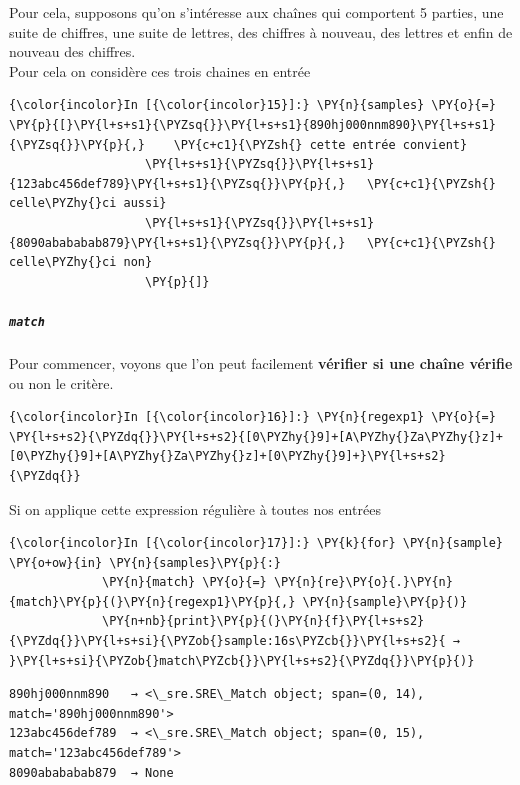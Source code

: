 Pour cela, supposons qu'on s'intéresse aux chaînes qui comportent 5
parties, une suite de chiffres, une suite de lettres, des chiffres à
nouveau, des lettres et enfin de nouveau des chiffres.\\

    Pour cela on considère ces trois chaines en entrée

    \begin{Verbatim}[commandchars=\\\{\}]
{\color{incolor}In [{\color{incolor}15}]:} \PY{n}{samples} \PY{o}{=} \PY{p}{[}\PY{l+s+s1}{\PYZsq{}}\PY{l+s+s1}{890hj000nnm890}\PY{l+s+s1}{\PYZsq{}}\PY{p}{,}    \PY{c+c1}{\PYZsh{} cette entrée convient}
                   \PY{l+s+s1}{\PYZsq{}}\PY{l+s+s1}{123abc456def789}\PY{l+s+s1}{\PYZsq{}}\PY{p}{,}   \PY{c+c1}{\PYZsh{} celle\PYZhy{}ci aussi}
                   \PY{l+s+s1}{\PYZsq{}}\PY{l+s+s1}{8090abababab879}\PY{l+s+s1}{\PYZsq{}}\PY{p}{,}   \PY{c+c1}{\PYZsh{} celle\PYZhy{}ci non}
                   \PY{p}{]}
\end{Verbatim}


    \hypertarget{match}{%
\subparagraph{\texorpdfstring{\texttt{match}}{match}}\label{match}}

    Pour commencer, voyons que l'on peut facilement \textbf{vérifier si une
chaîne vérifie} ou non le critère.

    \begin{Verbatim}[commandchars=\\\{\}]
{\color{incolor}In [{\color{incolor}16}]:} \PY{n}{regexp1} \PY{o}{=} \PY{l+s+s2}{\PYZdq{}}\PY{l+s+s2}{[0\PYZhy{}9]+[A\PYZhy{}Za\PYZhy{}z]+[0\PYZhy{}9]+[A\PYZhy{}Za\PYZhy{}z]+[0\PYZhy{}9]+}\PY{l+s+s2}{\PYZdq{}}
\end{Verbatim}


    Si on applique cette expression régulière à toutes nos entrées

    \begin{Verbatim}[commandchars=\\\{\}]
{\color{incolor}In [{\color{incolor}17}]:} \PY{k}{for} \PY{n}{sample} \PY{o+ow}{in} \PY{n}{samples}\PY{p}{:}
             \PY{n}{match} \PY{o}{=} \PY{n}{re}\PY{o}{.}\PY{n}{match}\PY{p}{(}\PY{n}{regexp1}\PY{p}{,} \PY{n}{sample}\PY{p}{)}
             \PY{n+nb}{print}\PY{p}{(}\PY{n}{f}\PY{l+s+s2}{\PYZdq{}}\PY{l+s+si}{\PYZob{}sample:16s\PYZcb{}}\PY{l+s+s2}{ → }\PY{l+s+si}{\PYZob{}match\PYZcb{}}\PY{l+s+s2}{\PYZdq{}}\PY{p}{)}
\end{Verbatim}


    \begin{Verbatim}[commandchars=\\\{\}]
890hj000nnm890   → <\_sre.SRE\_Match object; span=(0, 14), match='890hj000nnm890'>
123abc456def789  → <\_sre.SRE\_Match object; span=(0, 15), match='123abc456def789'>
8090abababab879  → None

    \end{Verbatim}

